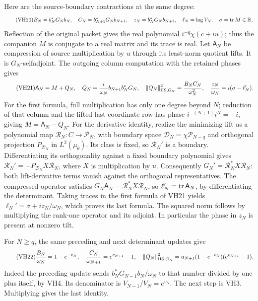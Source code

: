 Here are the source-boundary contractions at the same degree:
\begin{equation}\tag{VH20}\label{hvh:VH20}
B_N=b_N^*G_Nb_N,\quad C_N=b_{N+1}^*G_Nb_{N+1},\quad
z_N=b_N^*G_Nb_{N+1},\quad
\ell_N=\log V_N,\quad \sigma=\operatorname{tr} M\in\mathbb R.
\end{equation}
Reflection of the original packet gives the real polynomial
\(i^{-q}\chi(c+iu)\); thus the companion \(M\) is conjugate to a real
matrix and its trace is real. Let \(\mathsf A_N\) be compression of
source multiplication by \(u\) through its least-norm quotient lifts.
It is \(G_N\)-selfadjoint. The outgoing column computation with the
retained phases gives
\begin{equation}\tag{VH21}\label{hvh:VH21}
\mathsf A_N=M+Q_N,\quad
Q_N=\frac{i}{\omega_N}b_{N+1}b_N^*G_N,\quad
\left\lVert Q_N\right\rVert_{\mathrm{HS},G_N}^2=\frac{B_NC_N}{\omega_N^2},\quad
\frac{z_N}{\omega_N}=i(\sigma-\ell_N').
\end{equation}
For the first formula, full multiplication has only one degree beyond
\(N\); reduction of that column and the lifted last-coordinate row
has phase \(i^{-(N+1)}i^N=-i\), giving \(M=\mathsf A_N-Q_N\).
For the derivative identity, realize the minimizing lift as a polynomial
map \(\mathcal R_N:C\to\mathcal P_N\), with boundary space
\(\mathcal D_N=\chi\mathcal P_{N-q}\) and orthogonal projection
\(P_{\mathcal D_N}\) in \(L^2(\mu_\theta)\). Its class is fixed, so
\(\mathcal R_N'\) is a boundary. Differentiating its orthogonality
against a fixed boundary polynomial gives
\(\mathcal R_N'=-P_{\mathcal D_N}X\mathcal R_N\), where \(X\) is
multiplication by \(u\). Consequently
\(G_N'=\mathcal R_N^*X\mathcal R_N\): both lift-derivative terms vanish
against the orthogonal representatives. The compressed operator satisfies
\(G_N\mathsf A_N=\mathcal R_N^*X\mathcal R_N\), so
\(\ell_N'=\operatorname{tr}\mathsf A_N\), by differentiating the determinant.
Taking traces in the first formula of VH21 yields
\(\ell_N'=\sigma+i z_N/\omega_N\), which proves its last formula.
The squared norm follows by multiplying the rank-one operator and its
adjoint. In particular the phase in \(z_N\) is present at nonzero tilt.

For \(N\ge q\), the same preceding and next determinant updates give
\begin{equation}\tag{VH22}\label{hvh:VH22}
\frac{B_N}{\omega_N}=1-e^{-v_N},\quad
\frac{C_N}{\omega_{N+1}}=e^{v_{N+1}}-1,\quad
\left\lVert Q_N\right\rVert_{\mathrm{HS},G_N}^2
=a_{N+1}(1-e^{-v_N})(e^{v_{N+1}}-1).
\end{equation}
Indeed the preceding update sends
\(b_N^*G_{N-1}b_N/\omega_N\) to that number divided by one plus itself,
by VH4. Its denominator is \(V_{N-1}/V_N=e^{v_N}\).
The next step is VH3. Multiplying gives the last identity.

